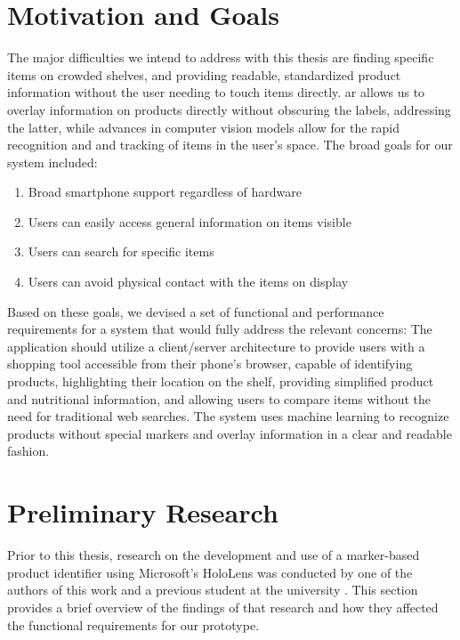 \documentclass[thesis]{fputhesis}
\begin{document}
\begin{body}
\section{Motivation and Goals}
The major difficulties we intend to address with this thesis are finding specific items on crowded shelves, and providing readable, standardized product information without the user needing to touch items directly. \acrshort{ar} allows us to overlay information on products directly without obscuring the labels, addressing the latter, while advances in computer vision models allow for the rapid recognition and and tracking of items in the user's space. The broad goals for our system included:
\begin{enumerate}
    \item Broad smartphone support regardless of hardware
    \item Users can easily access general information on items visible
    \item Users can search for specific items
    \item Users can avoid physical contact with the items on display
\end{enumerate}
Based on these goals, we devised a set of functional and performance requirements for a system that would fully address the relevant concerns: The application should utilize a client/server architecture to provide users with a shopping tool accessible from their phone's browser, capable of identifying products, highlighting their location on the shelf, providing simplified product and nutritional information, and allowing users to compare items without the need for traditional web searches. The system uses machine learning to recognize products without special markers and overlay information in a clear and readable fashion. 

\section{Preliminary Research}
Prior to this thesis, research on the development and use of a marker-based product identifier using Microsoft's HoloLens was conducted by one of the authors of this work and a previous student at the university\cite{souza-herod_augmented_2021} . This section provides a brief overview of the findings of that research and how they affected the functional requirements for our prototype.


\end{body}
\end{document}
